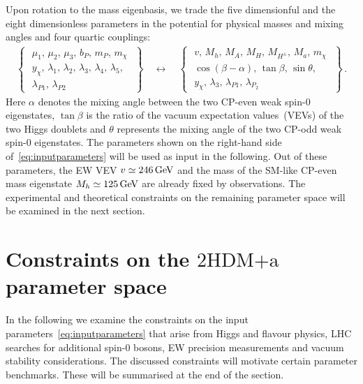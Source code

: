 \documentclass[a4paper, 11pt,notoc]{article}
\newcommand{\hdma}{\ensuremath{\textrm{2HDM+a}}\xspace}
\begin{document}
Upon rotation to the mass eigenbasis, we trade the five dimensionful and the eight dimensionless parameters in the potential  for physical masses and mixing angles and four quartic couplings:
\begin{align} \label{eq:inputparameters}
\left\{ \,\,\begin{matrix}
\mu_1,\,\mu_2,\,\mu_3,\,b_P,\,m_P,\,m_\chi\\[3pt]
y_\chi,\,\lambda_1,\,\lambda_2,\,\lambda_3,\,\lambda_4,\,\lambda_5,\\
\lambda_{P1},\,\lambda_{P2}
\end{matrix}\,\,\right\}\quad  \longleftrightarrow  \quad \left\{ \,\,\begin{matrix}
v,\,M_h,\,M_A,\,M_H,\,M_{H^\pm},\,M_a,\,m_\chi \\[3pt]
\cos(\beta-\alpha),\,\tan \beta,\,\sin  \theta,\\[3pt]
y_\chi,\,\lambda_3,\,\lambda_{P1},\,\lambda_{P_2}
\end{matrix}\,\,\right\}\,.
\end{align}
Here $\alpha$ denotes the mixing angle between the two CP-even weak spin-0 eigenstates, $\tan \beta$ is the ratio of the vacuum expectation values~(VEVs) of the two Higgs doublets and $\theta$ represents the mixing angle of the two CP-odd weak spin-0 eigenstates. The parameters shown on the right-hand side of~\eqref{eq:inputparameters} will be used as input in the following. Out of these  parameters, the EW VEV $v \simeq 246 \, {\rm GeV}$ and the mass of the SM-like CP-even mass eigenstate $M_h \simeq 125 \, {\rm GeV}$ are already fixed by observations. The experimental and theoretical constraints on the remaining parameter space will be examined in the next section. 


\section{Constraints on the \hdma parameter space}
\label{sec:constraints}

In the following we examine the constraints on the input parameters~\eqref{eq:inputparameters} that arise from Higgs and flavour physics, LHC searches for additional spin-0 bosons, EW precision measurements and vacuum stability considerations. The discussed constraints will motivate certain parameter benchmarks. These will be summarised at the end of the section. 
\end{document}
